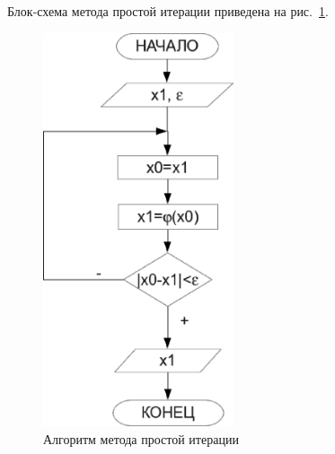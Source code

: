 Блок-схема метода простой итерации приведена на рис.~\ref{ch04:refDrawing8}.
\begin{figure}[htb]
\begin{center}
\includegraphics[width=0.5\textwidth]{img/ris_4_9}
\caption{Алгоритм метода простой итерации}
\label{ch04:refDrawing8}
\end{center}
\end{figure}

